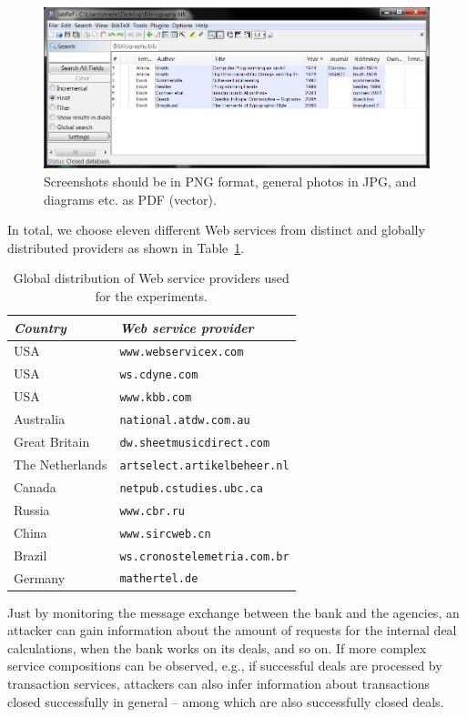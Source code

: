 \begin{figure}[tb]
	\centering
	\includegraphics[width=\columnwidth]{gfx/jabref} %
	\caption{Screenshots should be in PNG format, general photos in JPG, and diagrams etc. as PDF (vector).}\label{fig:screenshot}
\end{figure}


In total, we choose eleven different Web services from distinct and globally distributed providers as shown in Table~\ref{tab:wsdistr}. 
\begin{table}[tb]
	\centering
	\caption{Global distribution of Web service providers used for the experiments.}\label{tab:wsdistr}
	\begin{tabular}{ll}\toprule
		\emph{Country} & \emph{Web service provider} \\ \midrule
		USA & \texttt{www.webservicex.com} \\
		USA & \texttt{ws.cdyne.com} \\
		USA & \texttt{www.kbb.com} \\
		Australia & \texttt{national.atdw.com.au} \\
		Great Britain & \texttt{dw.sheetmusicdirect.com} \\
		The Netherlands & \texttt{artselect.artikelbeheer.nl} \\
		Canada & \texttt{netpub.cstudies.ubc.ca} \\ \midrule
		Russia & \texttt{www.cbr.ru} \\ 
		China & \texttt{www.sircweb.cn} \\
		Brazil & \texttt{ws.cronostelemetria.com.br} \\
		Germany & \texttt{mathertel.de} \\ \bottomrule
	\end{tabular}
\end{table}

Just by monitoring the message exchange between the bank and the agencies, an attacker can gain information about the amount of requests for the internal deal calculations, when the bank works on its deals, and so on. If more complex service compositions can be observed, e.g., if successful deals are processed by transaction services, attackers can also infer information about transactions closed successfully in general -- among which are also successfully closed deals.  


